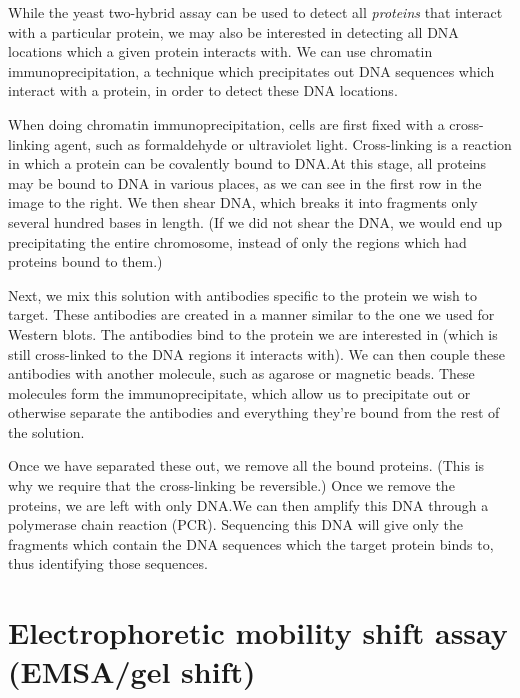 \documentclass{article}
\begin{document}
While the yeast two-hybrid assay can be used to detect all \emph{proteins} that interact with a
particular protein, we may also be interested in detecting all DNA locations which a given protein
interacts with. We can use chromatin immunoprecipitation, a technique which precipitates out DNA
sequences which interact with a protein, in order to detect these DNA locations.

When doing chromatin immunoprecipitation, cells are first fixed with a cross-linking agent, such as
formaldehyde or ultraviolet light. Cross-linking is a reaction in which a protein can be covalently
bound to DNA.\@ At this stage, all proteins may be bound to DNA in various places, as we can see in
the first row in the image to the right. We then shear DNA, which breaks it into fragments only
several hundred bases in length. (If we did not shear the DNA, we would end up precipitating the
entire chromosome, instead of only the regions which had proteins bound to them.)

Next, we mix this solution with antibodies specific to the protein we wish to target. These
antibodies are created in a manner similar to the one we used for Western blots. The antibodies bind
to the protein we are interested in (which is still cross-linked to the DNA regions it interacts
with). We can then couple these antibodies with another molecule, such as agarose or magnetic beads.
These molecules form the immunoprecipitate, which allow us to precipitate out or otherwise separate
the antibodies and everything they're bound from the rest of the solution.

Once we have separated these out, we remove all the bound proteins. (This is why we require that the
cross-linking be reversible.) Once we remove the proteins, we are left with only DNA.\@ We can then
amplify this DNA through a polymerase chain reaction (PCR). Sequencing this DNA will give only the
fragments which contain the DNA sequences which the target protein binds to, thus identifying those
sequences.

\section*{Electrophoretic mobility shift assay (EMSA/gel shift)}
\end{document}
